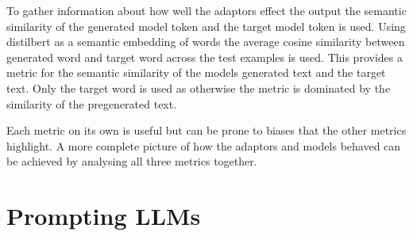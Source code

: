 To gather information about how well the adaptors effect the output the semantic similarity of the generated model token and the target model token is used.
Using distilbert \cite{distilbert} as a semantic embedding of words the average cosine similarity between generated word and target word across the test examples is used.
This provides a metric for the semantic similarity of the models generated text and the target text.
Only the target word is used as otherwise the metric is dominated by the similarity of the pregenerated text.

Each metric on its own is useful but can be prone to biases that the other metrics highlight.
A more complete picture of how the adaptors and models behaved can be achieved by analysing all three metrics together.

\section{Prompting LLMs}
